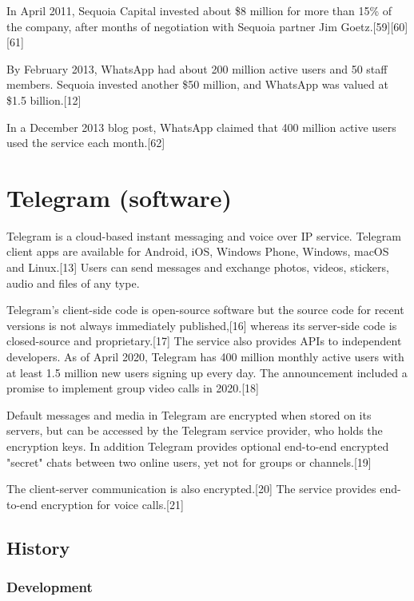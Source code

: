 \documentclass[12pt]{article}
\begin{document}
In April 2011, Sequoia Capital invested about \$8 million for more than 15\% of the company, after months of negotiation with Sequoia partner Jim Goetz.[59][60][61]

By February 2013, WhatsApp had about 200 million active users and 50 staff members. Sequoia invested another \$50 million, and WhatsApp was valued at \$1.5 billion.[12]

In a December 2013 blog post, WhatsApp claimed that 400 million active users used the service each month.[62] 



\newpage

\section{Telegram (software)}



Telegram is a cloud-based instant messaging and voice over IP service. Telegram client apps are available for Android, iOS, Windows Phone, Windows, macOS and Linux.[13] Users can send messages and exchange photos, videos, stickers, audio and files of any type.

Telegram's client-side code is open-source software but the source code for recent versions is not always immediately published,[16] whereas its server-side code is closed-source and proprietary.[17] The service also provides APIs to independent developers. As of April 2020, Telegram has 400 million monthly active users with at least 1.5 million new users signing up every day. The announcement included a promise to implement group video calls in 2020.[18]

Default messages and media in Telegram are encrypted when stored on its servers, but can be accessed by the Telegram service provider, who holds the encryption keys. In addition Telegram provides optional end-to-end encrypted "secret" chats between two online users, yet not for groups or channels.[19]

The client-server communication is also encrypted.[20] The service provides end-to-end encryption for voice calls.[21] 





\subsection{History}


\subsubsection{Development}
\end{document}

